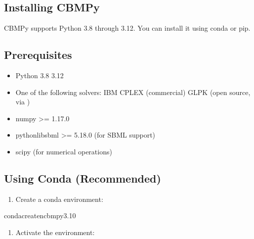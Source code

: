 \documentclass[letterpaper,12pt,english]{sphinxmanual}
\begin{document}
\subsection{Installing CBMPy}
\label{\detokenize{installation:installing-cbmpy}}
\sphinxAtStartPar
CBMPy supports Python 3.8 through 3.12. You can install it using conda or pip.


\subsection{Prerequisites}
\label{\detokenize{installation:prerequisites}}
\sphinxAtStartPar
{}
\begin{itemize}
\item {} 
\sphinxAtStartPar
Python 3.8 \sphinxhyphen{} 3.12

\item {} 
\sphinxAtStartPar
One of the following solvers:
\sphinxhyphen{} IBM CPLEX (commercial)
\sphinxhyphen{} GLPK (open source, via )

\item {} 
\sphinxAtStartPar
numpy \textgreater{}= 1.17.0

\item {} 
\sphinxAtStartPar
python\sphinxhyphen{}libsbml \textgreater{}= 5.18.0 (for SBML support)

\item {} 
\sphinxAtStartPar
scipy (for numerical operations)

\end{itemize}


\subsection{Using Conda (Recommended)}
\label{\detokenize{installation:using-conda-recommended}}\begin{enumerate}
%
\item {} 
\sphinxAtStartPar
Create a conda environment:

\end{enumerate}

\begin{sphinxVerbatim}[commandchars=\\\{\}]
condacreate\PYGZhy{}ncbmpy3.10
\end{sphinxVerbatim}
\begin{enumerate}
%
\setcounter{enumi}{1}
\item {} 
\sphinxAtStartPar
Activate the environment:

\end{enumerate}
\end{document}
